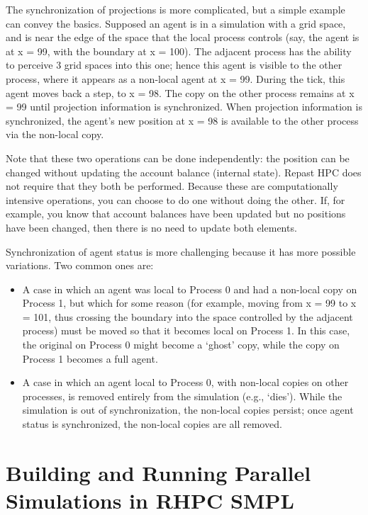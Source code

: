 The synchronization of projections is more complicated, but a simple example can convey the basics. Supposed an agent is in a simulation with a grid space, and is near the edge of the space that the local process controls (say, the agent is at x = 99, with the boundary at x = 100). The adjacent process has the ability to perceive 3 grid spaces into this one; hence this agent is visible to the other process, where it appears as a non-local agent at x = 99. During the tick, this agent moves back a step, to x = 98. The copy on the other process remains at x = 99 until projection information is synchronized. When projection information is synchronized, the agent's new position at x = 98 is available to the other process via the non-local copy.

Note that these two operations can be done independently: the position can be changed without updating the account balance (internal state). Repast HPC does not require that they both be performed. Because these are computationally intensive operations, you can choose to do one without doing the other. If, for example, you know that account balances have been updated but no positions have been changed, then there is no need to update both elements.

Synchronization of agent status is more challenging because it has more possible variations. Two common ones are:

\begin{itemize}
\item A case in which an agent was local to Process 0 and had a non-local copy on Process 1, but which for some reason (for example, moving from x = 99 to x = 101, thus crossing the boundary into the space controlled by the adjacent process) must be moved so that it becomes local on Process 1. In this case, the original on Process 0 might become a `ghost' copy, while the copy on Process 1 becomes a full agent.
\item A case in which an agent local to Process 0, with non-local copies on other processes, is removed entirely from the simulation (e.g., `dies'). While the simulation is out of synchronization, the non-local copies persist; once agent status is synchronized, the non-local copies are all removed.
\end{itemize}

\section {Building and Running Parallel Simulations in RHPC SMPL}